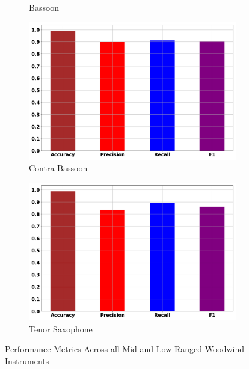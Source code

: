\documentclass[12pt,letterpaper]{article}
\begin{document}
\begin{figure}[H]
\begin{subfigure}[b]{0.45\textwidth}
	\caption{Bassoon}
	\end{subfigure}	
	\begin{subfigure}[b]{0.45\textwidth}
	\centering
	\includegraphics[width=\textwidth]{../FiguresClasses/ContraBassoon}
	\caption{Contra Bassoon}
	\end{subfigure}	
	\begin{subfigure}[b]{0.45\textwidth}
	\centering
	\includegraphics[width=\textwidth]{../FiguresClasses/Saxophone}
	\caption{Tenor Saxophone}
	\end{subfigure}
\caption{Performance Metrics Across all Mid and Low Ranged Woodwind Instruments}
\label{fig-LowWindsScores}
\end{figure}
\end{document}
